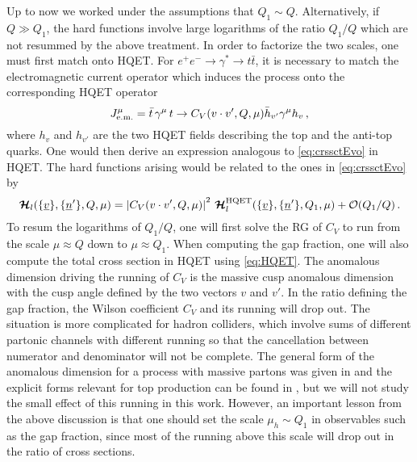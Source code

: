\documentclass[11pt,a4paper]{article}
\begin{document}
Up to now we worked under the assumptions that $Q_1 \sim Q$. Alternatively, if $Q\gg Q_1$, the hard functions involve large logarithms of the ratio $Q_1/Q$ which are not resummed by the above treatment. In order to factorize the two scales, one must first match onto HQET. For $e^+ e^- \to \gamma^* \to t \bar{t}$, it is necessary  to match the electromagnetic current operator which induces the process onto the corresponding HQET operator
\begin{equation}\label{eq:HQET}
J^\mu_{\rm e.m.} = \bar{t} \,\gamma^\mu \, t  \to  C_V(v\cdot v' ,Q, \mu) \bar{h}_{v'} \gamma^\mu h_v \,,
\end{equation}
where $h_v$ and $h_{v'}$ are the two HQET fields describing the top and the anti-top quarks. One would then derive an expression analogous to \eqref{eq:crssctEvo} in HQET. The hard functions arising would be related to the ones in \eqref{eq:crssctEvo} by
\begin{equation}
\bm{\mathcal{H}}_l(\{\underline{v}\},\{\underline{n}^\prime\},Q,\mu) = \left|C_V(v\cdot v' ,Q, \mu)\right|^2 \, \bm{\mathcal{H}}^{\rm HQET}_l(\{\underline{v}\},\{\underline{n}^\prime\},Q_1,\mu)  + \mathcal{O}(Q_1/Q)\,.
\end{equation}
To resum the logarithms of $Q_1/Q$, one will first solve the RG of $C_V$ to run from the scale $\mu \approx Q$ down to $\mu \approx Q_1$. When computing the gap fraction, one will also compute the total cross section in HQET using \eqref{eq:HQET}. The anomalous dimension driving the running of $C_V$ is the massive cusp anomalous dimension with the cusp angle defined by the two vectors $v$ and $v'$. In the ratio defining the gap fraction, the Wilson coefficient $C_V$ and its running will drop out. The situation is more complicated for hadron colliders, which involve sums of different partonic channels with different running so that the cancellation between numerator and denominator will not be complete. The general form of the anomalous dimension for a process with massive partons was given in \cite{Becher:2009kw} and the explicit forms relevant for top production can be found in \cite{Ahrens:2010zv}, but we will not study the small effect of this running in this work. However, an important lesson from the above discussion is that one should set the scale $\mu_h\sim Q_1$ in observables such as the gap fraction, since most of the running above this scale will drop out in the ratio of cross sections.
\end{document}
